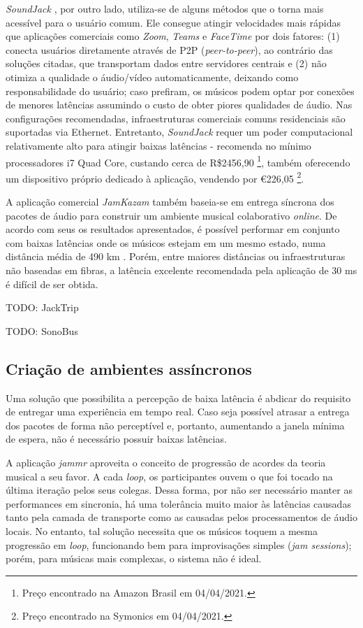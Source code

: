 \textit{SoundJack} \cite{soundjack}, por outro lado, utiliza-se de alguns métodos que o torna mais acessível para o usuário comum. Ele consegue atingir velocidades mais rápidas que aplicações comerciais como \textit{Zoom}, \textit{Teams} e \textit{FaceTime} por dois fatores: (1) conecta usuários diretamente através de P2P (\textit{peer-to-peer}), ao contrário das soluções citadas, que transportam dados entre servidores centrais e (2) não otimiza a qualidade o áudio/vídeo automaticamente, deixando como responsabilidade do usuário; caso prefiram, os músicos podem optar por conexões de menores latências assumindo o custo de obter piores qualidades de áudio. Nas configurações recomendadas, infraestruturas comerciais comuns residenciais são suportadas via Ethernet. Entretanto, \textit{SoundJack} requer um poder computacional relativamente alto para atingir baixas latências - recomenda no mínimo processadores i7 Quad Core, custando cerca de R\$2456,90 \footnote{Preço encontrado na Amazon Brasil em 04/04/2021.}, também oferecendo um dispositivo próprio dedicado à aplicação, vendendo por €226,05 \footnote{Preço encontrado na Symonics em 04/04/2021.}.

A aplicação comercial \textit{JamKazam} \cite{jamkazam} também baseia-se em entrega síncrona dos pacotes de áudio para construir um ambiente musical colaborativo \textit{online}. De acordo com seus os resultados apresentados, é possível performar em conjunto com baixas latências onde os músicos estejam em um mesmo estado, numa distância média de 490 km \cite{jamkazam_video}. Porém, entre maiores distâncias ou infraestruturas não baseadas em fibras, a latência excelente recomendada pela aplicação de 30 ms \cite{jamkazam_latencies} é difícil de ser obtida.

TODO: JackTrip

TODO: SonoBus

\subsection{Criação de ambientes assíncronos}

Uma solução que possibilita a percepção de baixa latência é abdicar do requisito de entregar uma experiência em tempo real. Caso seja possível atrasar a entrega dos pacotes de forma não perceptível e, portanto, aumentando a janela mínima de espera, não é necessário possuir baixas latências.

A aplicação \textit{jammr} \cite{jammr} aproveita o conceito de progressão de acordes da teoria musical a seu favor. A cada \textit{loop}, os participantes ouvem o que foi tocado na última iteração pelos seus colegas. Dessa forma, por não ser necessário manter as performances em sincronia, há uma tolerância muito maior às latências causadas tanto pela camada de transporte como as causadas pelos processamentos de áudio locais. No entanto, tal solução necessita que os músicos toquem a mesma progressão em \textit{loop}, funcionando bem para improvisações simples (\textit{jam sessions}); porém, para músicas mais complexas, o sistema não é ideal.

